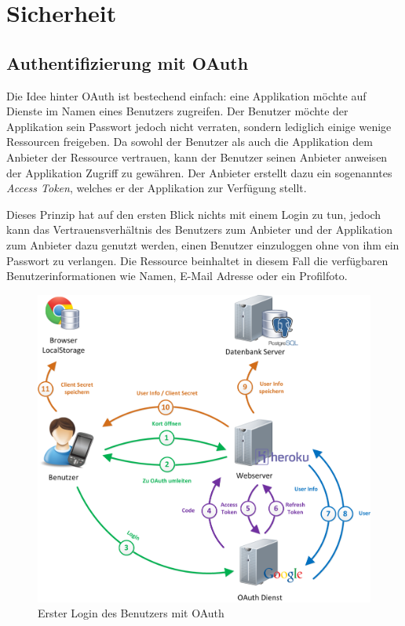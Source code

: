 \section{Sicherheit}
\subsection{Authentifizierung mit OAuth}
\label{oauth}

Die Idee hinter \gls{OAuth} ist bestechend einfach: eine Applikation möchte auf Dienste im Namen eines Benutzers zugreifen.
Der Benutzer möchte der Applikation sein Passwort jedoch nicht verraten, sondern lediglich einige wenige Ressourcen freigeben.
Da sowohl der Benutzer als auch die Applikation dem Anbieter der Ressource vertrauen, kann der Benutzer seinen Anbieter anweisen der Applikation Zugriff zu gewähren.
Der Anbieter erstellt dazu ein sogenanntes \emph{Access Token}, welches er der Applikation zur Verfügung stellt.

Dieses Prinzip hat auf den ersten Blick nichts mit einem Login zu tun, jedoch kann das Vertrauensverhältnis des Benutzers zum Anbieter und der Applikation zum Anbieter dazu genutzt werden, einen Benutzer einzuloggen ohne von ihm ein Passwort zu verlangen. 
Die Ressource beinhaltet in diesem Fall die verfügbaren Benutzerinformationen wie Namen, E-Mail Adresse oder ein Profilfoto.

\begin{figure}[H]
	\centering
	\includegraphics[scale=0.4]{images/implementation/backend/kort-login}
	\caption{Erster Login des Benutzers mit OAuth}
	\label{image-kort-login}
\end{figure}

